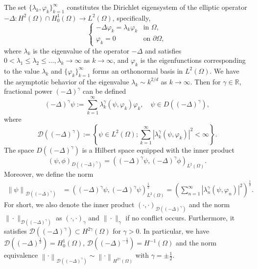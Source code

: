 \documentclass[11pt]{article}
\numberwithin{equation}{section}
\begin{document}
The set $\{\lambda_k, \varphi_k\}_{k=1}^{\infty}$ constitutes the Dirichlet eigensystem of the elliptic operator $-\Delta: H^2(\Omega) \cap H_0^1(\Omega) \to L^2(\Omega)$, specifically,
\begin{equation*}%
\begin{cases}
-\Delta \varphi_k = \lambda_k \varphi_k & \text{in } \Omega, \\
\varphi_k =0 & \text{on } \partial \Omega,
\end{cases}
\end{equation*}
where $\lambda_k$ is the eigenvalue of the operator $-\Delta$ and satisfies $0 < \lambda_1 \leq \lambda_2 \leq \ldots , \lambda_k \rightarrow \infty$ as $k \rightarrow \infty$, and $\varphi_k$ is the eigenfunctions corresponding to the value $\lambda_k$ and $\{\varphi_k\}_{k=1}^\infty$ forms an orthonormal basis in $L^2(\Omega)$. We have the asymptotic behavior of the eigenvalue $\lambda_k\sim k^{2/d}$ as $k\to\infty$. Then for $\gamma\in\mathbb R$, fractional power $(-\Delta )^{\gamma}$ can be defined 
\begin{equation*}
  (-\Delta )^{\gamma}\psi:=\sum_{k=1}^{\infty}\lambda_k^{\gamma}(\psi, \varphi _k)\varphi _k,\quad \psi \in D((-\Delta)^\gamma),
\end{equation*}
where  
$$\mathcal{D}((-\Delta )^{\gamma}):=\left \{ \psi\in L^{2}(\Omega); \sum_{k=1}^{\infty}\left |\lambda_k^{\gamma}(\psi, \varphi _k ) \right |^2<\infty  \right \}.
$$
The space $D((-\Delta)^\gamma)$ is a Hilbert space equipped with the inner product
\begin{equation*}
( \psi, \phi)_{D((-\Delta)^\gamma)}  = \left ((-\Delta)^\gamma \psi, (-\Delta)^\gamma\phi \right )_{L^2(\Omega)}.
\end{equation*}
Moreover, we define the norm 
$$
\begin{aligned}
\left \| \psi  \right \|_{\mathcal{D}((-\Delta )^\gamma) } 
&= \left ((-\Delta)^\gamma \psi, (-\Delta)^\gamma\psi \right )_{L^2(\Omega)}^{\frac12} 
= \left ( \sum_{n=1}^{\infty}\left |\lambda_n^{\gamma}(\psi, \varphi_n )  \right |^2 \right )^\frac{1}{2}.
\end{aligned}
$$
For short, we also denote the inner product $(\cdot,\cdot)_{\mathcal D((-\Delta)^\gamma)}$ and the norm $\|\cdot\|_{\mathcal D((-\Delta)^\gamma)}$ as $(\cdot,\cdot)_\gamma$ and $\|\cdot\|_\gamma$ if no conflict occurs. Furthermore, it satisfies $\mathcal{D}((-\Delta )^\gamma)\subset{H^{2\gamma}(\Omega)}$ for $\gamma>0$. In particular, we have $\mathcal{D}((-\Delta )^\frac{1}{2}) = H_0^1(\Omega)$, $\mathcal{D}((-\Delta )^{-\frac{1}{2}}) = H^{-1}(\Omega)$ and the norm equivalence $\left \| \cdot   \right \| _{\mathcal{D}((-\Delta )^\gamma  ) }\sim \left \| \cdot  \right \| _{H^{2\gamma}(\Omega)}$ with $\gamma=\pm \frac12$. 
\end{document}
